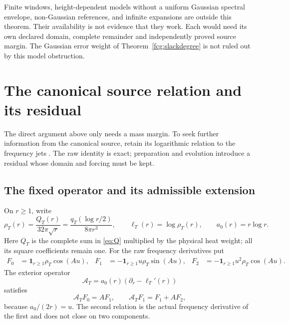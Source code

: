 \documentclass[11pt]{article}
\numberwithin{equation}{section}
\begin{document}
Finite windows, height-dependent models without a uniform Gaussian
spectral envelope, non-Gaussian references, and infinite expansions
are outside this theorem. Their availability is not evidence that
they work. Each would need its own declared domain, complete remainder
and independently proved source margin. The Gaussian error weight of
Theorem~\ref{fcg:slackdegree} is not ruled out by this model obstruction.

\section{The canonical source relation and its residual}
\label{sec:sourcerelation}

The direct argument above only needs a mass margin. To seek further
information from the canonical source, retain its logarithmic
relation to the frequency jets \cite{SourceRelationNote}.
The raw identity is exact; preparation and evolution introduce a
residual whose domain and forcing must be kept.

\subsection{The fixed operator and its admissible extension}

On $r\ge1$, write
\[
 \rho_T(r)=\frac{Q_T(r)}{32\pi\sqrt r}
          =\frac{q_T(\log r/2)}{8\pi r^3},\qquad
 \ell_T(r)=\log\rho_T(r),\qquad a_0(r)=r\log r.
\]
Here $Q_T$ is the complete sum in \eqref{eq:Q} multiplied by the
physical heat weight; all its square coefficients remain one.
For the raw frequency derivatives put
\begin{align*}
 F_0&=\mathbf1_{r\ge1}\rho_T\cos(Au),&
 F_1&=-\mathbf1_{r\ge1}u\rho_T\sin(Au),&
 F_2&=-\mathbf1_{r\ge1}u^2\rho_T\cos(Au).
\end{align*}
The exterior operator
\begin{equation}\label{eq:sourceoperator}
 \mathcal A_T=a_0(r)(\partial_r-\ell_T'(r))
\end{equation}
satisfies
\begin{equation}\label{eq:sourcerawrelation}
 \mathcal A_TF_0=AF_1,\qquad
 \mathcal A_TF_1=F_1+AF_2,
\end{equation}
because $a_0/(2r)=u$. The second relation is the actual frequency
derivative of the first and does not close on two components.
\end{document}
